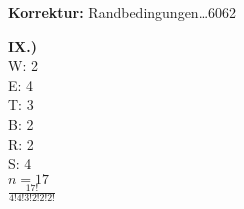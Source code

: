 \documentclass[12pt]{scrartcl}
\begin{document}
\textbf{Korrektur:} Randbedingungen\dots 6062

\newpage
\textbf{IX.)}\\
W: 2\\
E: 4\\
T: 3\\
B: 2\\
R: 2\\
S: 4\\

$n = 17$\\

$\displaystyle{\frac{17!}{4!4!3!2!2!2!}}$





% 
\end{document}
